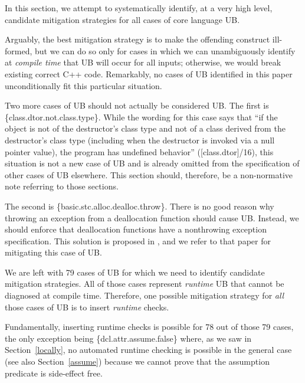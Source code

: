 In this section, we attempt to systematically identify, at a very high level, candidate mitigation strategies for all cases of core language UB.


Arguably, the best mitigation strategy is to make the offending construct ill-formed, but we can do so only for cases in which we can unambiguously identify at \emph{compile time} that UB will occur for all inputs; otherwise, we would break existing correct C++ code. Remarkably, no cases of UB identified in this paper unconditionally fit this particular situation.

Two more cases of UB should not actually be considered UB. The first is \{class.dtor.not.class.type\}. While the wording for this case says that ``if the object is not of the destructor's class type and not of a class derived from the destructor's class type (including when the destructor is invoked via a null pointer value), the program has undefined behavior'' ([class.dtor]/16),
this situation is not a new case of UB and is already omitted from the specification of other cases of UB elsewhere. This section should, therefore, be a non-normative note referring to those sections.

The second is \{basic.stc.alloc.dealloc.throw\}. There is no good reason why throwing an exception from a deallocation function should cause UB. Instead, we should enforce that deallocation functions have a nonthrowing exception specification. This solution is proposed in \cite{P3424R0}, and we refer to that paper for mitigating this case of UB.

We are left with 79 cases of UB for which we need to identify candidate mitigation strategies. All of those cases represent \emph{runtime} UB that cannot be diagnosed at compile time. Therefore, one possible mitigation strategy for \emph{all} those cases of UB is to insert \emph{runtime} checks.

Fundamentally, inserting runtime checks is possible for 78 out of those 79 cases, the only exception being \{dcl.attr.assume.false\} where, as we saw in Section~\ref{locally}, no automated runtime checking is possible in the general case (see also Section~\ref{assume}) because we cannot prove that the assumption predicate is side-effect free.

